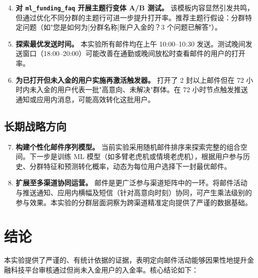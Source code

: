 \documentclass[12pt,a4paper]{ctexart}
\begin{document}
\begin{enumerate}[leftmargin=2em, label=\textbf{\arabic*.}]
  \setcounter{enumi}{3}

  \item \textbf{对 \texttt{ml\_funding\_faq} 开展主题行变体 A/B 测试。}
    该模板内容显然引发共鸣，但通过优化不同分群的主题行可进一步提升打开率。推荐主题行假设：分群特定问题（如"您是如何为[分群名称]账户入金的？3 个问题已解答"）。

  \item \textbf{探索最优发送时间。}
    本实验所有邮件均在上午 10:00--10:30 发送。测试晚间发送窗口（18:00--20:00）可能改善在通勤或晚间放松时查看邮件的用户的打开率。

  \item \textbf{为已打开但未入金的用户实施再激活触发器。}
    打开了 2 封以上邮件但在 72 小时内未入金的用户代表一批"高意向、未解决"群体。在 72 小时节点触发推送通知或应用内消息，可能高效转化这批用户。

\end{enumerate}

\subsection{长期战略方向}

\begin{enumerate}[leftmargin=2em, label=\textbf{\arabic*.}]
  \setcounter{enumi}{6}

  \item \textbf{构建个性化邮件序列模型。}
    当前实验采用随机邮件排序来探索完整的组合空间。下一步是训练 ML 模型（如多臂老虎机或情境老虎机），根据用户参与历史、分群特征和预测转化概率，动态为每位用户选择下一封最优邮件。

  \item \textbf{扩展至多渠道协同运营。}
    邮件是更广泛参与渠道矩阵中的一环。将邮件活动与推送通知、应用内横幅及短信（针对高意向时刻）协同，可产生乘法级别的参与效果。本实验的分群层面洞察为跨渠道精准定向提供了严谨的数据基础。

\end{enumerate}

\clearpage
\section{结论}

本实验提供了严谨的、有统计依据的证据，表明定向邮件活动能够因果性地提升金融科技平台审核通过但尚未入金用户的入金率。核心结论如下：
\end{document}
